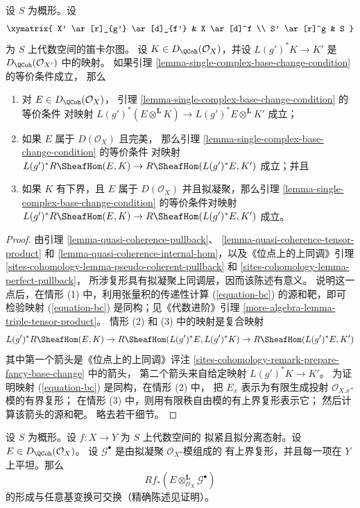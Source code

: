 \begin{lemma}
\label{lemma-single-complex-base-change-condition-inherited}
设 $S$ 为概形。设
$$
\xymatrix{
X' \ar[r]_{g'} \ar[d]_{f'} &
X \ar[d]^f \\
S' \ar[r]^g &
S
}
$$
为 $S$ 上代数空间的笛卡尔图。
设 $K \in D_\QCoh(\mathcal{O}_X)$，并设 $L(g')^*K \to K'$
是 $D_\QCoh(\mathcal{O}_{X'})$ 中的映射。
如果引理 \ref{lemma-single-complex-base-change-condition} 的等价条件成立，
那么
\begin{enumerate}
\item 对 $E \in D_\QCoh(\mathcal{O}_X)$，
引理 \ref{lemma-single-complex-base-change-condition} 的等价条件
对映射
$L(g')^*(E \otimes^\mathbf{L} K) \to L(g')^*E \otimes^\mathbf{L} K'$
成立；
\item 如果 $E$ 属于 $D(\mathcal{O}_X)$ 且完美，%
那么引理 \ref{lemma-single-complex-base-change-condition} 的等价条件
对映射
$L(g')^*R\SheafHom(E, K) \to R\SheafHom(L(g')^*E, K')$ 成立；并且
\item 如果 $K$ 有下界，且 $E$ 属于 $D(\mathcal{O}_X)$
并且拟凝聚，那么引理 %
\ref{lemma-single-complex-base-change-condition} 的等价条件对映射
$L(g')^*R\SheafHom(E, K) \to R\SheafHom(L(g')^*E, K')$ 成立。
\end{enumerate}
\end{lemma}

\begin{proof}
由引理
\ref{lemma-quasi-coherence-pullback}、
\ref{lemma-quasi-coherence-tensor-product} 和
\ref{lemma-quasi-coherence-internal-hom}，以及《位点上的上同调》引理
\ref{sites-cohomology-lemma-pseudo-coherent-pullback} 和
\ref{sites-cohomology-lemma-perfect-pullback}，
所涉复形具有拟凝聚上同调层，因而该陈述有意义。
说明这一点后，在情形 (1) 中，利用张量积的传递性计算
(\ref{equation-bc}) 的源和靶，即可检验映射
(\ref{equation-bc}) 是同构；见《代数进阶》引理
\ref{more-algebra-lemma-triple-tensor-product}。
情形 (2) 和 (3) 中的映射是复合映射
$$
L(g')^*R\SheafHom(E, K) \to R\SheafHom(L(g')^*E, L(g')^*K)
\to R\SheafHom(L(g')^*E, K')
$$
其中第一个箭头是《位点上的上同调》评注
\ref{sites-cohomology-remark-prepare-fancy-base-change} 中的箭头，
第二个箭头来自给定映射 $L(g')^*K \to K'$。
为证明映射 (\ref{equation-bc}) 是同构，在情形 (2) 中，
把 $E_x$ 表示为有限生成投射 $\mathcal{O}_{X. x}$-模的有界复形；%
在情形 (3) 中，则用有限秩自由模的有上界复形表示它；
然后计算该箭头的源和靶。
略去若干细节。
\end{proof}

\begin{lemma}
\label{lemma-base-change-tensor}
设 $S$ 为概形。设 $f : X \to Y$ 为 $S$ 上代数空间的
拟紧且拟分离态射。设 $E \in D_\QCoh(\mathcal{O}_X)$。
设 $\mathcal{G}^\bullet$ 是由拟凝聚 $\mathcal{O}_X$-模组成的
有上界复形，并且每一项在 $Y$ 上平坦。那么
$$
Rf_*(E \otimes^\mathbf{L}_{\mathcal{O}_X} \mathcal{G}^\bullet)
$$
的形成与任意基变换可交换（精确陈述见证明）。
\end{lemma}

